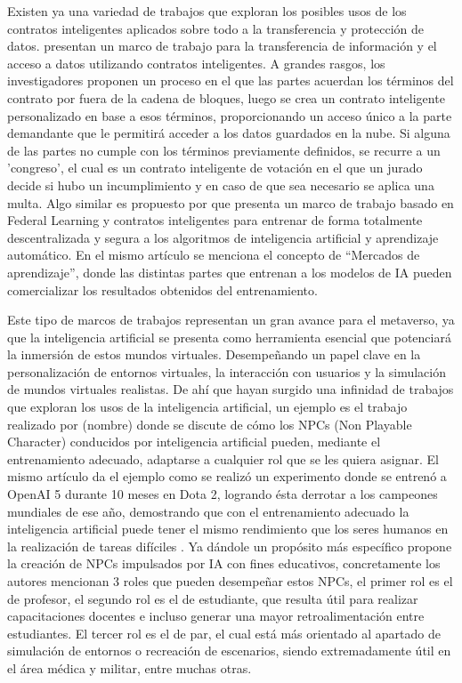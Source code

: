 \documentclass[a4paper,10pt]{article}
\begin{document}
	Existen ya una variedad de trabajos que exploran los posibles usos de los contratos inteligentes aplicados sobre todo a la transferencia y protección de datos. \textcite{liu2018enforceable} presentan un marco de trabajo para la transferencia de información y el acceso a datos utilizando contratos inteligentes. A grandes rasgos, los investigadores proponen un proceso en el que las partes acuerdan los términos del contrato por fuera de la cadena de bloques, luego se crea un contrato inteligente personalizado en base a esos términos, proporcionando un acceso único a la parte demandante que le permitirá acceder a los datos guardados en la nube. Si alguna de las partes no cumple con los términos previamente definidos, se recurre a un 'congreso', el cual es un contrato inteligente de votación en el que un jurado decide si hubo un incumplimiento y en caso de que sea necesario se aplica una multa.
	Algo similar es propuesto por \textcite{ouyang2020learning} que presenta un marco de trabajo basado en Federal Learning y contratos inteligentes para entrenar de forma totalmente descentralizada y segura a los algoritmos de inteligencia artificial y aprendizaje automático. En el mismo artículo se menciona el concepto de “Mercados de aprendizaje”, donde las distintas partes que entrenan a los modelos de IA pueden comercializar los resultados obtenidos del entrenamiento.
	
	Este tipo de marcos de trabajos representan un gran avance para el metaverso, ya que la inteligencia artificial se presenta como herramienta esencial que potenciará la inmersión de estos mundos virtuales. Desempeñando un papel clave en la personalización de entornos virtuales, la interacción con usuarios y la simulación de mundos virtuales realistas. De ahí que hayan surgido una infinidad de trabajos que exploran los usos de la inteligencia artificial, un ejemplo es el trabajo realizado por (nombre) donde se discute de cómo los NPCs (Non Playable Character) conducidos por inteligencia artificial pueden, mediante el entrenamiento adecuado, adaptarse a cualquier rol que se les quiera asignar. El mismo artículo da el ejemplo como se realizó un experimento donde se entrenó a OpenAI 5 durante 10 meses en Dota 2, logrando ésta derrotar a los campeones mundiales de ese año, demostrando que con el entrenamiento adecuado la inteligencia artificial puede tener el mismo rendimiento que los seres humanos en la realización de tareas difíciles \textcite{yang2022fusing}. Ya dándole un propósito más específico \textcite{hwang2022definition}  propone la creación de NPCs impulsados por IA con fines educativos, concretamente los autores mencionan 3 roles que pueden desempeñar estos NPCs, el primer rol es el de profesor, el segundo rol es el de estudiante, que resulta útil para realizar capacitaciones docentes e incluso generar una mayor retroalimentación entre estudiantes. El tercer rol es el de par, el cual está más orientado al apartado de simulación de entornos o recreación de escenarios, siendo extremadamente útil en el área médica y militar, entre muchas otras.
	
\end{document}
